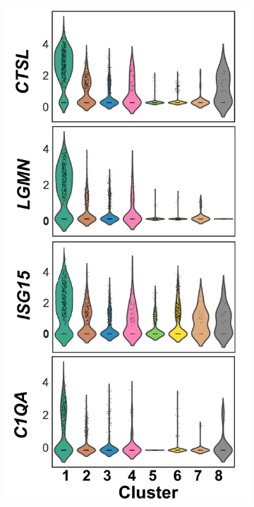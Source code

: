 \begin{figure}[H]
\begin{subfigure}[b]{0.35\textwidth}
		\includegraphics[width=\textwidth]{./Results3/pdfs/PSA_monocytes_scanpy_single_cell_vln_plots_C1}
		\caption{}
	\end{subfigure}%
	~
	\begin{subfigure}[b]{0.35\textwidth} 

\end{subfigure}
\end{figure}
